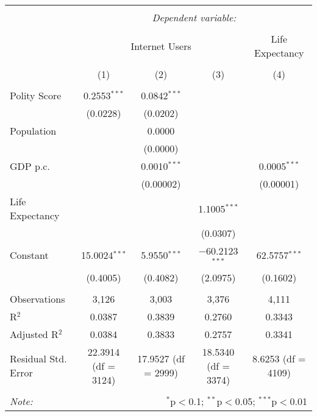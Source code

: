 
\begingroup 
\scriptsize 
\begin{tabular}{@{\extracolsep{0pt}}lcccc} 
\\[-1.8ex]\hline 
\hline \\[-1.8ex] 
 & \multicolumn{4}{c}{\textit{Dependent variable:}} \\ 
\cline{2-5} 
\\[-1.8ex] & \multicolumn{3}{c}{Internet Users} & Life Expectancy \\ 
\\[-1.8ex] & (1) & (2) & (3) & (4)\\ 
\hline \\[-1.8ex] 
 Polity Score & 0.2553$^{***}$ & 0.0842$^{***}$ &  &  \\ 
  & (0.0228) & (0.0202) &  &  \\ 
  Population &  & 0.0000 &  &  \\ 
  &  & (0.0000) &  &  \\ 
  GDP p.c. &  & 0.0010$^{***}$ &  & 0.0005$^{***}$ \\ 
  &  & (0.00002) &  & (0.00001) \\ 
  Life Expectancy &  &  & 1.1005$^{***}$ &  \\ 
  &  &  & (0.0307) &  \\ 
  Constant & 15.0024$^{***}$ & 5.9550$^{***}$ & $-$60.2123$^{***}$ & 62.5757$^{***}$ \\ 
  & (0.4005) & (0.4082) & (2.0975) & (0.1602) \\ 
 \hline \\[-1.8ex] 
Observations & 3,126 & 3,003 & 3,376 & 4,111 \\ 
R$^{2}$ & 0.0387 & 0.3839 & 0.2760 & 0.3343 \\ 
Adjusted R$^{2}$ & 0.0384 & 0.3833 & 0.2757 & 0.3341 \\ 
Residual Std. Error & 22.3914 (df = 3124) & 17.9527 (df = 2999) & 18.5340 (df = 3374) & 8.6253 (df = 4109) \\ 
\hline 
\hline \\[-1.8ex] 
\textit{Note:}  & \multicolumn{4}{r}{$^{*}$p$<$0.1; $^{**}$p$<$0.05; $^{***}$p$<$0.01} \\ 
\end{tabular} 
\endgroup 
